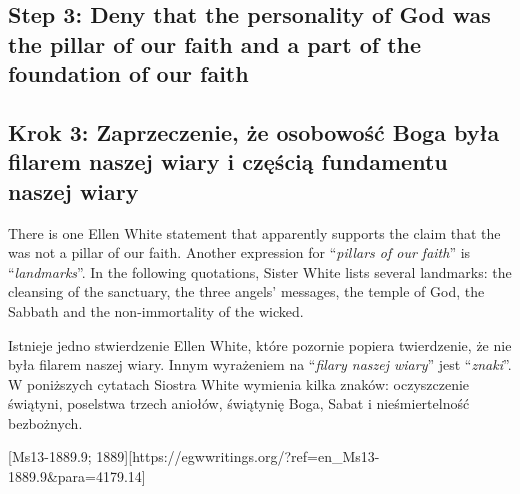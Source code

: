 \subsection*{Step 3: Deny that the personality of God was the pillar of our faith and a part of the foundation of our faith}


\subsection*{Krok 3: Zaprzeczenie, że osobowość Boga była filarem naszej wiary i częścią fundamentu naszej wiary}


There is one Ellen White statement that apparently supports the claim that the  was not a pillar of our faith. Another expression for “\textit{pillars of our faith}” is “\textit{landmarks}”. In the following quotations, Sister White lists several landmarks: the cleansing of the sanctuary, the three angels’ messages, the temple of God, the Sabbath and the non-immortality of the wicked.


Istnieje jedno stwierdzenie Ellen White, które pozornie popiera twierdzenie, że  nie była filarem naszej wiary. Innym wyrażeniem na “\textit{filary naszej wiary}” jest “\textit{znaki}”. W poniższych cytatach Siostra White wymienia kilka znaków: oczyszczenie świątyni, poselstwa trzech aniołów, świątynię Boga, Sabat i nieśmiertelność bezbożnych.


[Ms13-1889.9; 1889][https://egwwritings.org/?ref=en\_Ms13-1889.9&para=4179.14]



